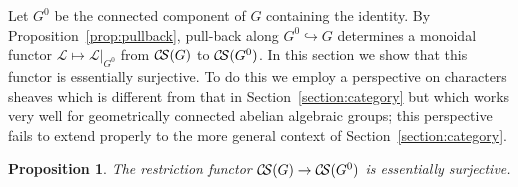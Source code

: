 \documentclass[11pt]{amsart}
\theoremstyle{plain}
\newtheorem{proposition}[theorem]{Proposition}
\theoremstyle{definition}
\theoremstyle{remark}
\newcommand{\cs}[1]{{\mathcal{#1}}}
\newcommand{\CS}{{\mathcal{C\hskip-1.8pt S}}}
\begin{document}
Let $G^0$ be the connected component of $G$ containing the identity.
By Proposition~\ref{prop:pullback}, pull-back along
$G^0\hookrightarrow G$ determines a monoidal functor
$\cs{L}\mapsto \cs{L}\vert_{G^0}$ from $\CS(G)$ to $\CS(G^0)$.  In
this section we show that this functor is essentially surjective. To
do this we employ a perspective on characters sheaves which is
different from that in Section~\ref{section:category} but which works
very well for geometrically connected abelian algebraic groups; this
perspective fails to extend properly to the more general context of
Section~\ref{section:category}.

\begin{proposition}\label{prop:restriction}
  The restriction functor $\CS(G)\to \CS(G^0)$ is essentially surjective.
\end{proposition}
\end{document}
